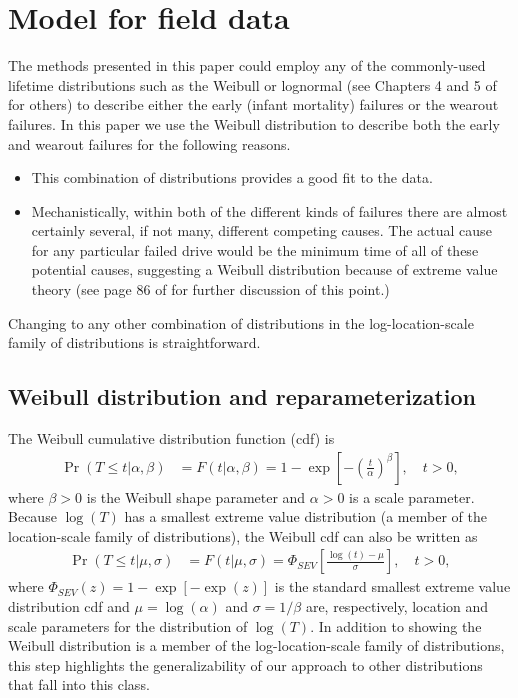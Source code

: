 \documentclass[11pt]{article}
\begin{document}
\section{Model for field data}
\label{sec:GLFP model}
The methods presented in this paper
could employ any of the commonly-used lifetime distributions such as
the Weibull or lognormal (see Chapters 4 and 5 of
\cite{meeker} for others) to describe either the early
(infant mortality) failures or the wearout failures. 
In this paper
we use the Weibull distribution to describe both the early and
wearout failures for the following reasons.
\begin{itemize}
\item
This combination of distributions provides a good fit to the data.
\item
Mechanistically, within both of the different kinds of failures there
are almost certainly several, if not many, different competing
causes. The actual cause for any particular failed drive
would be the minimum time of all of these potential causes, suggesting a
Weibull distribution because of extreme value theory (see page 86  of
\cite{meeker} for further discussion of this point.)
\end{itemize}


Changing to any other combination of distributions
in the log-location-scale family of distributions is
straightforward.

\subsection{Weibull distribution and reparameterization}
\label{sec:Weibull parameterization}
The Weibull cumulative
 distribution function (cdf) is
\begin{align}
\label{equation:weibull.cdf}
\Pr(T \leq t|\alpha,\beta ) &= F(t|\alpha,\beta)=1-
\exp \left [-\left (\frac{t}{\alpha} \right )^{\beta}
\right ], \quad t > 0,
\end{align}
where $\beta>0$ is the Weibull shape parameter and $\alpha>0$ is a
scale parameter. Because $\log(T)$ has a smallest extreme value
distribution (a member of the location-scale family of
distributions), the Weibull cdf can also be written as
\begin{align*}
\Pr(T \leq t| \mu,\sigma ) &= F(t| \mu,\sigma)= \Phi_{SEV}\left[\frac{\log(t)-\mu}{\sigma}\right], \quad t > 0,
\end{align*}
where $\Phi_{SEV}(z)=1-\exp[-\exp(z)]$ is the standard smallest extreme value
distribution cdf and
$\mu=\log(\alpha)$ and $\sigma=1/\beta$ are, respectively, location
and scale parameters for the distribution of $\log(T)$. In addition to showing the Weibull
distribution is a member of the log-location-scale family of
distributions, this step highlights the generalizability of our approach to other distributions 
that fall into this class.
\end{document}

